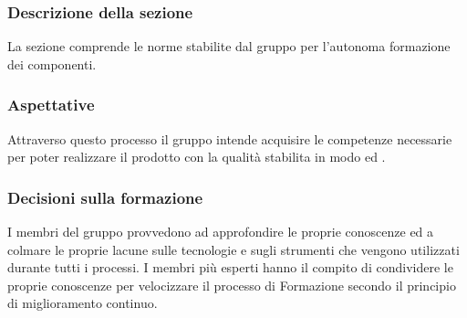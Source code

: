 \subsubsection{Descrizione della sezione}
La sezione comprende le norme stabilite dal gruppo per l'autonoma formazione dei componenti.
\subsubsection{Aspettative}
Attraverso questo processo il gruppo intende acquisire le competenze necessarie per poter realizzare il prodotto con la qualità stabilita in modo  ed .
\subsubsection{Decisioni sulla formazione}\label{DecisioniFormazione}
I membri del gruppo provvedono ad approfondire le proprie conoscenze ed a colmare le proprie lacune sulle tecnologie e sugli strumenti che vengono utilizzati durante tutti i processi. I membri più esperti hanno il compito di condividere le proprie conoscenze per velocizzare il processo di Formazione secondo il principio di miglioramento continuo.